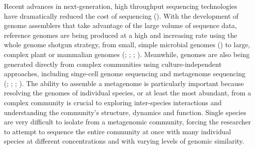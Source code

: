 \documentclass[phd,tocprelim]{cornell}
\begin{document}
Recent advances in next-generation, high throughput sequencing technologies have dramatically reduced the cost of sequencing (\cite{Metzker2010}).  With the development of genome assemblers that take advantage of the large volume of sequence data, reference genomes are being produced at a high and increasing rate using the whole genome shotgun strategy, from small, simple microbial genomes (\cite{Wu2009}) to large, complex plant or mammalian genomes (\cite{Fujimoto2010};  \cite{Li2010}; \cite{Schmutz2010}; \cite{Zimin2008}). Meanwhile, genomes are also being generated directly from complex communities using culture-independent approaches, including singe-cell genome sequencing and metagenome sequencing (\cite{Woyke2010}; \cite{Yilmaz2011}; \cite{Hess2011}; \cite{Iverson2012}). The ability to assemble a metagenome is particularly important because resolving the genomes of individual species, or at least the most abundant, from a complex community is crucial to exploring inter-species interactions and understanding the community's structure, dynamics and function. Single species are very difficult to isolate from a metagenomic community, forcing the researcher to attempt to sequence the entire community at once with many individual species at different concentrations and with varying levels of genomic similarity.
\end{document}
